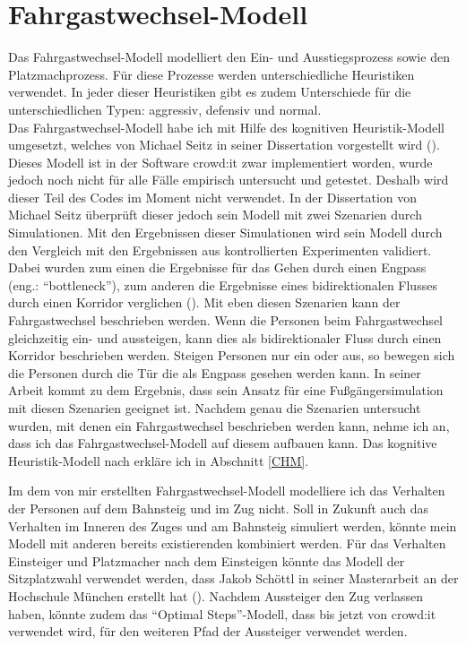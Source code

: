 \section{Fahrgastwechsel-Modell} \label{Fahrgastwechsel-Modell}
Das Fahrgastwechsel-Modell modelliert den Ein- und Ausstiegsprozess sowie den Platzmachprozess. Für diese Prozesse werden unterschiedliche Heuristiken verwendet. In jeder dieser Heuristiken gibt es zudem Unterschiede für die unterschiedlichen Typen: aggressiv, defensiv und normal. \\
Das Fahrgastwechsel-Modell habe ich mit Hilfe des kognitiven Heuristik-Modell umgesetzt, welches von Michael Seitz in seiner Dissertation vorgestellt wird (\cite{Seitz.2016}). Dieses Modell ist in der Software crowd:it zwar implementiert worden, wurde jedoch noch nicht für alle Fälle empirisch untersucht und getestet. Deshalb wird dieser Teil des Codes im Moment nicht verwendet. In der Dissertation von Michael Seitz überprüft dieser jedoch sein Modell mit zwei Szenarien durch Simulationen. Mit den Ergebnissen dieser Simulationen wird sein Modell durch den Vergleich mit den Ergebnissen aus kontrollierten Experimenten validiert. Dabei wurden zum einen die Ergebnisse für das Gehen durch einen Engpass (eng.: "`bottleneck"'), zum anderen die Ergebnisse eines bidirektionalen Flusses durch einen Korridor verglichen (\cite{Seitz.2016}). Mit eben diesen Szenarien kann der Fahrgastwechsel beschrieben werden. Wenn die Personen beim Fahrgastwechsel gleichzeitig ein- und aussteigen, kann dies als bidirektionaler Fluss durch einen Korridor beschrieben werden. Steigen Personen nur ein oder aus, so bewegen sich die Personen durch die Tür die als Engpass gesehen werden kann. In seiner Arbeit kommt \cite{Seitz.2016} zu dem Ergebnis, dass sein Ansatz für eine Fußgängersimulation mit diesen Szenarien geeignet ist. Nachdem genau die Szenarien untersucht wurden, mit denen ein Fahrgastwechsel beschrieben werden kann, nehme ich an, dass ich das Fahrgastwechsel-Modell auf diesem aufbauen kann. Das kognitive Heuristik-Modell nach \cite{Seitz.2016} erkläre ich in Abschnitt \ref{CHM}.

Im dem von mir erstellten Fahrgastwechsel-Modell modelliere ich das Verhalten der Personen auf dem Bahnsteig und im Zug nicht. Soll in Zukunft auch das Verhalten im Inneren des Zuges und am Bahnsteig simuliert werden, könnte mein Modell mit anderen bereits existierenden kombiniert werden. Für das Verhalten Einsteiger und Platzmacher nach dem Einsteigen könnte das Modell der Sitzplatzwahl verwendet werden, dass Jakob Schöttl in seiner Masterarbeit an der Hochschule München erstellt hat (\cite{Schottl.2016}). Nachdem Aussteiger den Zug verlassen haben, könnte zudem  das "`Optimal Steps"'-Modell, dass bis jetzt von crowd:it verwendet wird, für den weiteren Pfad der Aussteiger verwendet werden.
